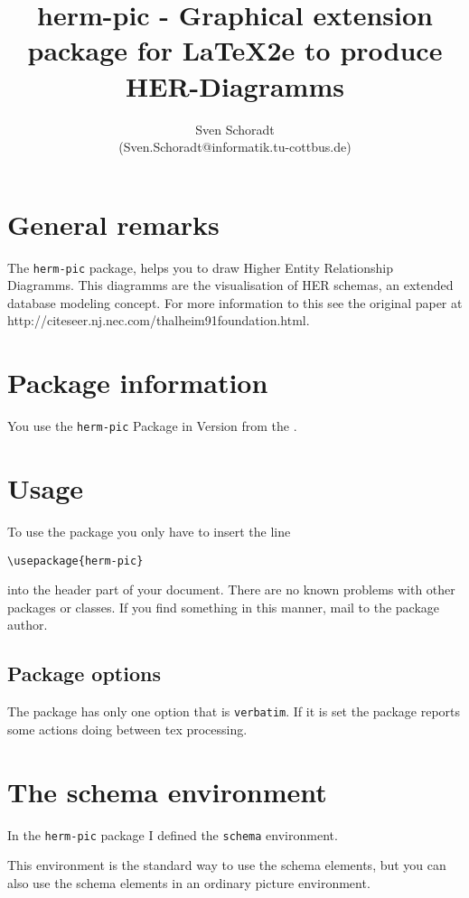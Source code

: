 \documentclass[a4paper,11pt]{article}
\author{Sven Schoradt \\ (Sven.Schoradt@informatik.tu-cottbus.de)}
\title{herm-pic - Graphical extension package for LaTeX2e to produce HER-Diagramms}
\begin{document}
\maketitle

\section{General remarks}

The {\tt herm-pic} package, helps you to draw Higher Entity Relationship Diagramms.
This diagramms are the visualisation of HER schemas, an extended database modeling 
concept. For more information to this see the original paper at 
http://citeseer.nj.nec.com/thalheim91foundation.html.

\section{Package information}

You use the {\tt herm-pic} Package in Version \HERMpicRev{} from the \HERMpicDate.

\section{Usage}

To use the package you only have to insert the line

\begin{verbatim}
\usepackage{herm-pic}
\end{verbatim}

into the header part of your document. There are no known problems with other
packages or classes. If you find something in this manner, mail to the package 
author.

\subsection{Package options}

The package has only one option that is {\tt verbatim}. If it is set the package
reports some actions doing between tex processing.

\section{The schema environment}

In the {\tt herm-pic} package I defined the {\tt schema} environment.

This environment is the standard way to use the schema elements, but you 
can also use the schema elements in an ordinary picture environment.
\end{document}
